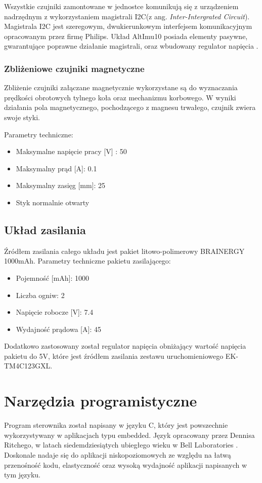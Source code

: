 Wszystkie czujniki zamontowane w jednostce komunikują się z urządzeniem nadrzędnym z wykorzystaniem magistrali I2C(z ang. {\em Inter-Intergrated Circuit}). Magistrala I2C jest szeregowym, dwukierunkowym interfejsem komunikacyjnym opracowanym przez firmę Philips. Układ AltImu10 posiada elementy pasywne, gwarantujące poprawne działanie magistrali, oraz wbudowany regulator napięcia \cite{Pololu}.
\subsubsection{Zbliżeniowe czujniki magnetyczne}
Zbliżenie czujniki załączane magnetycznie wykorzystane są do wyznaczania prędkości obrotowych tylnego koła oraz mechanizmu korbowego. W wyniki działania pola magnetycznego, pochodzącego z magnesu trwałego, czujnik zwiera swoje styki. 
 
Parametry techniczne:
\begin{itemize}
\item
Maksymalne napięcie pracy [V] : 50
\item
Maksymalny prąd [A]: 0.1
\item
Maksymalny zasięg [mm]: 25
\item
Styk normalnie otwarty
\end{itemize}
\subsection{Układ zasilania}
Źródłem zasilania całego układu jest pakiet litowo-polimerowy BRAINERGY 1000mAh.
Parametry techniczne pakietu zasilającego:
\begin{itemize}
\item
Pojemność [mAh]: 1000
\item
Liczba ogniw: 2
\item
Napięcie robocze [V]: 7.4
\item
Wydajność prądowa [A]: 45
\end{itemize}

Dodatkowo zastosowany został regulator napięcia obniżający wartość napięcia pakietu do 5V, które jest źródłem zasilania zestawu uruchomieniowego EK-TM4C123GXL.
\section{Narzędzia programistyczne}
Program sterownika został napisany w języku C, który jest powszechnie wykorzystywany w aplikacjach typu embedded. Język opracowany przez Dennisa Ritchego, w latach siedemdziesiątych ubiegłego wieku w Bell Laboratories \cite{prata}. Doskonale nadaje się do aplikacji niskopoziomowych ze względu na łatwą przenośność kodu, elastyczność oraz wysoką wydajność aplikacji napisanych w tym języku. 
